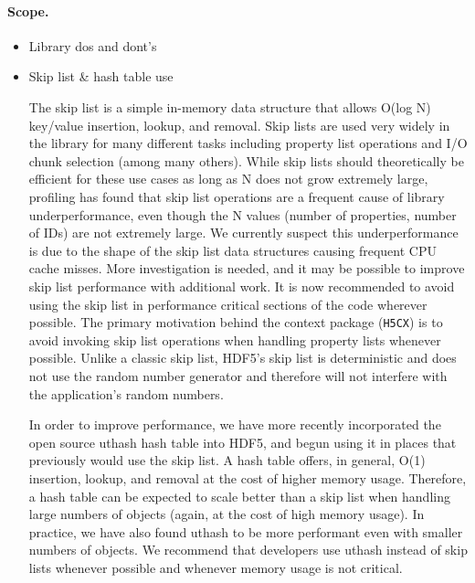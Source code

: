 



\paragraph{Scope.}

\begin{itemize}
    \item Library dos and dont's
    \item Skip list \& hash table use

The skip list is a simple in-memory data structure that allows O(log N) key/value insertion, lookup, and removal. Skip lists are used very widely in the library for many different tasks including property list operations and I/O chunk selection (among many others). While skip lists should theoretically be efficient for these use cases as long as N does not grow extremely large, profiling has found that skip list operations are a frequent cause of library underperformance, even though the N values (number of properties, number of IDs) are not extremely large. We currently suspect this underperformance is due to the shape of the skip list data structures causing frequent CPU cache misses. More investigation is needed, and it may be possible to improve skip list performance with additional work. It is now recommended to avoid using the skip list in performance critical sections of the code wherever possible. The primary motivation behind the context package (\texttt{H5CX}) is to avoid invoking skip list operations when handling property lists whenever possible. Unlike a classic skip list, HDF5's skip list is deterministic and does not use the random number generator and therefore will not interfere with the application's random numbers.

In order to improve performance, we have more recently incorporated the open source uthash hash table into HDF5, and begun using it in places that previously would use the skip list. A hash table offers, in general, O(1) insertion, lookup, and removal at the cost of higher memory usage. Therefore, a hash table can be expected to scale better than a skip list when handling large numbers of objects (again, at the cost of high memory usage). In practice, we have also found uthash to be more performant even with smaller numbers of objects. We recommend that developers use uthash instead of skip lists whenever possible and whenever memory usage is not critical.


\end{itemize}
